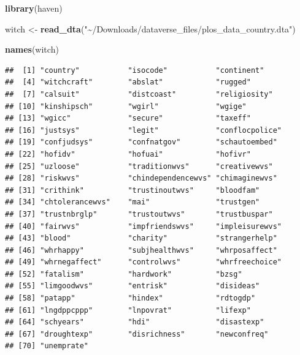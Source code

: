 \documentclass[
]{article}
\newenvironment{Shaded}{\begin{snugshade}}{\end{snugshade}}
\newcommand{\FunctionTok}[1]{\textcolor[rgb]{0.13,0.29,0.53}{\textbf{#1}}}
\newcommand{\NormalTok}[1]{#1}
\newcommand{\OtherTok}[1]{\textcolor[rgb]{0.56,0.35,0.01}{#1}}
\newcommand{\StringTok}[1]{\textcolor[rgb]{0.31,0.60,0.02}{#1}}
\begin{document}
\begin{Shaded}
\begin{Highlighting}[]
\FunctionTok{library}\NormalTok{(haven)}

\NormalTok{witch }\OtherTok{\textless{}{-}} \FunctionTok{read\_dta}\NormalTok{(}\StringTok{"\textasciitilde{}/Downloads/dataverse\_files/plos\_data\_country.dta"}\NormalTok{)}


\FunctionTok{names}\NormalTok{(witch)}
\end{Highlighting}
\end{Shaded}

\begin{verbatim}
##  [1] "country"           "isocode"           "continent"        
##  [4] "witchcraft"        "abslat"            "rugged"           
##  [7] "calsuit"           "distcoast"         "religiosity"      
## [10] "kinshipsch"        "wgirl"             "wgige"            
## [13] "wgicc"             "secure"            "taxeff"           
## [16] "justsys"           "legit"             "conflocpolice"    
## [19] "confjudsys"        "confnatgov"        "schautoembed"     
## [22] "hofidv"            "hofuai"            "hofivr"           
## [25] "uzloose"           "traditionwvs"      "creativewvs"      
## [28] "riskwvs"           "chindependencewvs" "chimaginewvs"     
## [31] "crithink"          "trustinoutwvs"     "bloodfam"         
## [34] "chtolerancewvs"    "mai"               "trustgen"         
## [37] "trustnbrglp"       "trustoutwvs"       "trustbuspar"      
## [40] "fairwvs"           "impfriendswvs"     "impleisurewvs"    
## [43] "blood"             "charity"           "strangerhelp"     
## [46] "whrhappy"          "subjhealthwvs"     "whrposaffect"     
## [49] "whrnegaffect"      "controlwvs"        "whrfreechoice"    
## [52] "fatalism"          "hardwork"          "bzsg"             
## [55] "limgoodwvs"        "entrisk"           "disideas"         
## [58] "patapp"            "hindex"            "rdtogdp"          
## [61] "lngdppcppp"        "lnpovrat"          "lifexp"           
## [64] "schyears"          "hdi"               "disastexp"        
## [67] "droughtexp"        "disrichness"       "newconfreq"       
## [70] "unemprate"
\end{verbatim}
\end{document}
